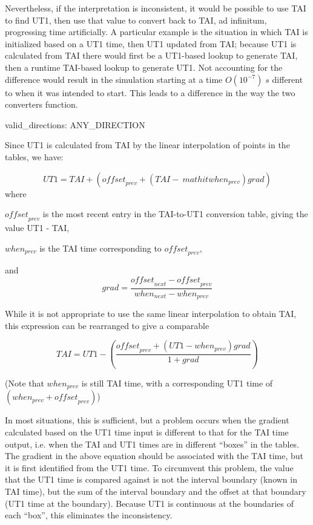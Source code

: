 {\begin{enumerate}
Nevertheless, if the interpretation is inconsistent, it would be
possible to use TAI to find UT1, then use that value to convert back to
TAI, ad infinitum, progressing time artificially.  A particular example
is the situation in which TAI is initialized based on a UT1 time, then
UT1 updated from TAI; because UT1 is calculated from TAI there would
first be a UT1-based lookup to generate TAI, then a runtime TAI-based
lookup to generate UT1.  Not accounting for the difference would result
in the simulation starting at a time $O(10^{-7}) \; s$ different to when it
was intended to start.  This leads to a difference in the way the two 
converters
function.



{\begin{enumerate}
valid\_directions:
ANY\_DIRECTION

Since UT1 is calculated from TAI by the linear interpolation of points
in the tables, we have:

\begin{equation}
\mathit{UT1}=\mathit{TAI}+\left(\mathit{offset}_{\mathit{prev}}+(\mathit{TAI}-\
mathit{when}_{\mathit{prev}})\mathit{grad}\right)
\end{equation}
where 

$\mathit{offset}_{prev}$ is the most recent entry in the
TAI-to-UT1 conversion table, giving the value UT1 - TAI,

${when}_{prev}$ is the TAI time corresponding to 
$\mathit{offset}_{prev}$,

and
\begin{equation*}
grad=\frac{{\mathit{offset}_{next}-\mathit{offset}_{prev}}}{{when}_{next}-{when
}_{prev}}
\end{equation*}

While it is not appropriate to use the same linear interpolation to
obtain TAI, this expression can be rearranged to give a comparable

\begin{equation*}
\mathit{TAI}=\mathit{UT1}-
\left(\frac{\mathit{offset}_{\mathit{prev}}+
\left(\mathit{UT1}-\mathit{when}_{\mathit{prev}}\right)\mathit{grad}}
{1+\mathit{grad}}\right)
\end{equation*}

(Note that  $\mathit{when}_{\mathit{prev}}$ is still TAI time, with a
corresponding UT1 time of 
$(\mathit{when}_{\mathit{prev}}+\mathit{offset}_{\mathit{prev}})$)

In most situations, this is sufficient, but a problem occurs when the
gradient calculated based on the UT1 time input is different to that
for the TAI time output, i.e. when the TAI and UT1 times are in
different {\textquotedblleft}boxes{\textquotedblright} in the tables. 
The gradient in the above equation should be associated with the TAI
time, but it is first identified from the UT1 time.  To circumvent this
problem, the value that the UT1 time is compared against is not the 
interval boundary
(known in TAI time), but the sum of the interval boundary and the
offset at that boundary (UT1 time at the boundary).  Because UT1 is
continuous at the boundaries of each
{\textquotedblleft}box{\textquotedblright}, this eliminates the
inconsistency.


\end{enumerate}}
\end{enumerate}}
